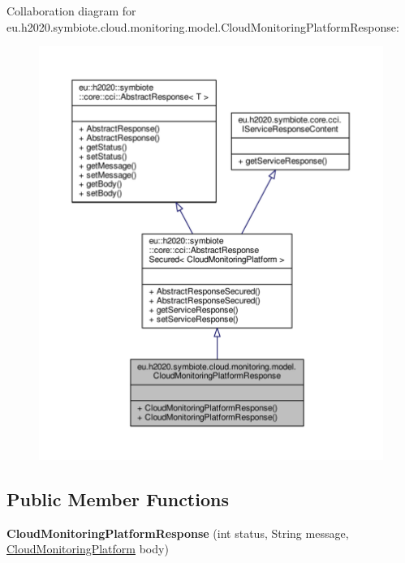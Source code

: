Collaboration diagram for eu.\+h2020.\+symbiote.\+cloud.\+monitoring.\+model.\+Cloud\+Monitoring\+Platform\+Response\+:
\nopagebreak
\begin{figure}[H]
\begin{center}
\leavevmode
\includegraphics[width=350pt]{classeu_1_1h2020_1_1symbiote_1_1cloud_1_1monitoring_1_1model_1_1CloudMonitoringPlatformResponse__coll__graph}
\end{center}
\end{figure}
\subsection*{Public Member Functions}
\begin{DoxyCompactItemize}
\item 
\mbox{\label{classeu_1_1h2020_1_1symbiote_1_1cloud_1_1monitoring_1_1model_1_1CloudMonitoringPlatformResponse_a6f1c57c0b68a9ad6740a07b8e259f583}} 
{\bfseries Cloud\+Monitoring\+Platform\+Response} (int status, String message, \hyperlink{classeu_1_1h2020_1_1symbiote_1_1cloud_1_1monitoring_1_1model_1_1CloudMonitoringPlatform}{Cloud\+Monitoring\+Platform} body)
\end{DoxyCompactItemize}


